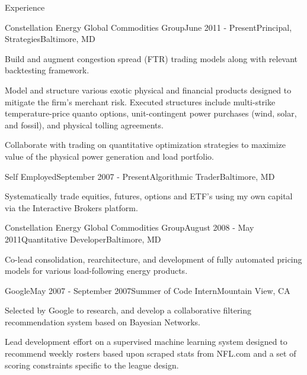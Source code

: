 \documentclass{resume} %
\begin{document}
\begin{rSection}{Experience}

\begin{rSubsection}{Constellation Energy Global Commodities Group}{June 2011 -
    Present}{Principal, Strategies}{Baltimore, MD}
\item Build and augment congestion spread (FTR) trading models along with relevant backtesting framework.
\item Model and structure various exotic physical and financial products
  designed to mitigate the firm's merchant risk.  Executed structures include multi-strike temperature-price quanto options,  unit-contingent power purchases (wind, solar, and fossil), and physical tolling agreements.
\item Collaborate with trading on quantitative optimization strategies to maximize value of the physical power generation and load portfolio.
\end{rSubsection}


\begin{rSubsection}{Self Employed}{September 2007 - Present}{Algorithmic Trader}{Baltimore, MD}
\item Systematically trade equities, futures, options and ETF's using my own capital via the Interactive Brokers platform.

\end{rSubsection}


\begin{rSubsection}{Constellation Energy Global Commodities Group}{August 2008 - May 2011}{Quantitative Developer}{Baltimore, MD}
\item Co-lead consolidation, rearchitecture, and development of fully automated pricing models for various load-following energy products.
\end{rSubsection}

\begin{rSubsection}{Google}{May 2007 - September 2007}{Summer of Code Intern}{Mountain View, CA}
\item Selected by Google to research, and develop a collaborative filtering recommendation system based on Bayesian Networks.
\item Lead development effort on a supervised machine learning system designed to recommend weekly rosters based upon scraped stats from NFL.com and a set of scoring constraints specific to the league design.
\end{rSubsection}

\end{rSection}
\end{document}
